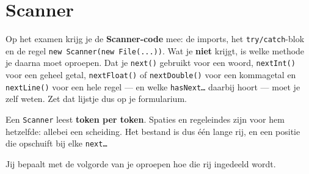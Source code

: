 \documentclass[a4paper,11pt]{article}
\begin{document}
\section{Scanner}

\begin{examenbox}
    Op het examen krijg je de \textbf{Scanner-code} mee: de imports, het
    \texttt{try/catch}-blok en de regel \texttt{new Scanner(new File(...))}. Wat je
    \textbf{niet} krijgt, is welke methode je daarna moet oproepen. Dat je
    \texttt{next()} gebruikt voor een woord, \texttt{nextInt()} voor een geheel
    getal, \texttt{nextFloat()} of \texttt{nextDouble()} voor een kommagetal en
    \texttt{nextLine()} voor een hele regel --- en welke \texttt{hasNext\dots} daarbij
    hoort --- moet je zelf weten. Zet dat lijstje dus op je formularium.
\end{examenbox}

Een \texttt{Scanner} leest \textbf{token per token}. Spaties en regeleindes zijn
voor hem hetzelfde: allebei een scheiding. Het bestand is dus \'e\'en lange rij,
en een positie die opschuift bij elke \texttt{next\dots}

\begin{center}
\end{center}

Jij bepaalt met de volgorde van je oproepen hoe die rij ingedeeld wordt.
\end{document}
